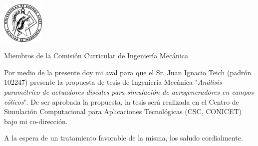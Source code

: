 \documentclass{letter}
\begin{document}
\begin{letter}{\includegraphics[width=0.15\textwidth]{Logo-fiuba.png}\hfill}

\opening{Miembros de la Comisión Curricular de Ingeniería Mecánica}
Por medio de la presente doy mi aval para que el Sr. Juan Ignacio Teich (padrón 102247) presente la propuesta de tesis de Ingeniería Mecánica "\textit{Análisis paramétrico de actuadores discales para simulación de aerogeneradores en campos eólicos}".  De ser aprobada la propuesta, la tesis será realizada en el Centro de Simulación Computacional para Aplicaciones Tecnológicas (CSC, CONICET) bajo mi co-dirección.
\closing{A la espera de un tratamiento favorable de la misma, los saludo cordialmente.}
\end{letter}
\end{document}

